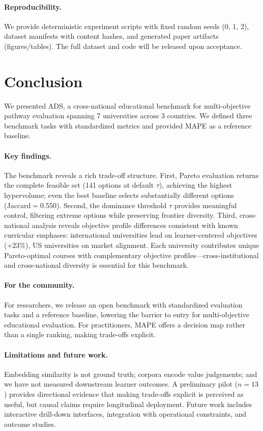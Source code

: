 \documentclass[sigconf,review]{acmart}
\newcommand{\NumUniversities}{7}
\newcommand{\NumCountries}{3}                %
\newcommand{\MainParetoSize}{141}
\newcommand{\BestBaselineJaccard}{0.550}
\newcommand{\LearnerGapPercent}{23\%}
\newcommand{\ADS}{\textsc{ADS}\xspace}
\newcommand{\MAPE}{\textsc{MAPE}\xspace}
\begin{document}
\paragraph{Reproducibility.}
We provide deterministic experiment scripts with fixed random seeds (0, 1, 2), dataset manifests with content hashes, and generated paper artifacts (figures/tables). The full dataset and code will be released upon acceptance.


\section{Conclusion}

We presented \ADS, a cross-national educational benchmark for multi-objective pathway evaluation spanning {\NumUniversities} universities across {\NumCountries} countries. We defined three benchmark tasks with standardized metrics and provided \MAPE as a reference baseline.

\paragraph{Key findings.}
The benchmark reveals a rich trade-off structure. First, Pareto evaluation returns the complete feasible set ({\MainParetoSize} options at default $\tau$), achieving the highest hypervolume; even the best baseline selects substantially different options (Jaccard$=${\BestBaselineJaccard}). Second, the dominance threshold $\tau$ provides meaningful control, filtering extreme options while preserving frontier diversity. Third, cross-national analysis reveals objective profile differences consistent with known curricular emphases: international universities lead on learner-centered objectives (+{\LearnerGapPercent}), US universities on market alignment. Each university contributes unique Pareto-optimal courses with complementary objective profiles---cross-institutional and cross-national diversity is essential for this benchmark.

\paragraph{For the community.}
For researchers, we release an open benchmark with standardized evaluation tasks and a reference baseline, lowering the barrier to entry for multi-objective educational evaluation. For practitioners, \MAPE offers a decision map rather than a single ranking, making trade-offs explicit.

\paragraph{Limitations and future work.}
Embedding similarity is not ground truth; corpora encode value judgements; and we have not measured downstream learner outcomes. A preliminary pilot ($n{=}13$) provides directional evidence that making trade-offs explicit is perceived as useful, but causal claims require longitudinal deployment. Future work includes interactive drill-down interfaces, integration with operational constraints, and outcome studies.
\end{document}
